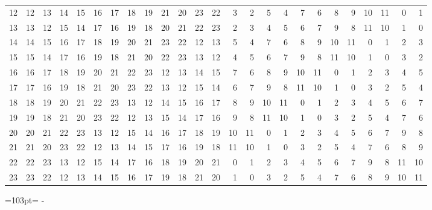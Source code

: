 \documentclass[10pt,a4paper]{article}
\newcommand{\needspace}[1]{\par\penalty-100\begingroup\dimen0=#1\relax\dimen2=\pagegoal
  \advance\dimen2-\pagetotal\ifdim\dimen0>\dimen2\relax\ifdim\dimen2>0pt\vfil\break\fi\fi
  \endgroup}
\numberwithin{equation}{section}
\begin{document}
{\begin{longtable}{@{}r|rrrrrrrrrrrrrrrrrrrrrrrr@{}}
12 & 12 & 13 & 14 & 15 & 16 & 17 & 18 & 19 & 21 & 20 & 23 & 22 & 3 & 2 & 5 & 4 & 7 & 6 & 8 & 9 & 10 & 11 & 0 & 1\\
13 & 13 & 12 & 15 & 14 & 17 & 16 & 19 & 18 & 20 & 21 & 22 & 23 & 2 & 3 & 4 & 5 & 6 & 7 & 9 & 8 & 11 & 10 & 1 & 0\\
14 & 14 & 15 & 16 & 17 & 18 & 19 & 20 & 21 & 23 & 22 & 12 & 13 & 5 & 4 & 7 & 6 & 8 & 9 & 10 & 11 & 0 & 1 & 2 & 3\\
15 & 15 & 14 & 17 & 16 & 19 & 18 & 21 & 20 & 22 & 23 & 13 & 12 & 4 & 5 & 6 & 7 & 9 & 8 & 11 & 10 & 1 & 0 & 3 & 2\\
16 & 16 & 17 & 18 & 19 & 20 & 21 & 22 & 23 & 12 & 13 & 14 & 15 & 7 & 6 & 8 & 9 & 10 & 11 & 0 & 1 & 2 & 3 & 4 & 5\\
17 & 17 & 16 & 19 & 18 & 21 & 20 & 23 & 22 & 13 & 12 & 15 & 14 & 6 & 7 & 9 & 8 & 11 & 10 & 1 & 0 & 3 & 2 & 5 & 4\\
18 & 18 & 19 & 20 & 21 & 22 & 23 & 13 & 12 & 14 & 15 & 16 & 17 & 8 & 9 & 10 & 11 & 0 & 1 & 2 & 3 & 4 & 5 & 6 & 7\\
19 & 19 & 18 & 21 & 20 & 23 & 22 & 12 & 13 & 15 & 14 & 17 & 16 & 9 & 8 & 11 & 10 & 1 & 0 & 3 & 2 & 5 & 4 & 7 & 6\\
20 & 20 & 21 & 22 & 23 & 13 & 12 & 15 & 14 & 16 & 17 & 18 & 19 & 10 & 11 & 0 & 1 & 2 & 3 & 4 & 5 & 6 & 7 & 9 & 8\\
21 & 21 & 20 & 23 & 22 & 12 & 13 & 14 & 15 & 17 & 16 & 19 & 18 & 11 & 10 & 1 & 0 & 3 & 2 & 5 & 4 & 7 & 6 & 8 & 9\\
22 & 22 & 23 & 13 & 12 & 15 & 14 & 17 & 16 & 18 & 19 & 20 & 21 & 0 & 1 & 2 & 3 & 4 & 5 & 6 & 7 & 9 & 8 & 11 & 10\\*
23 & 23 & 22 & 12 & 13 & 14 & 15 & 16 & 17 & 19 & 18 & 21 & 20 & 1 & 0 & 3 & 2 & 5 & 4 & 7 & 6 & 8 & 9 & 10 & 11\\
\bottomrule\end{longtable}}
\needspace{103pt}
\end{document}
